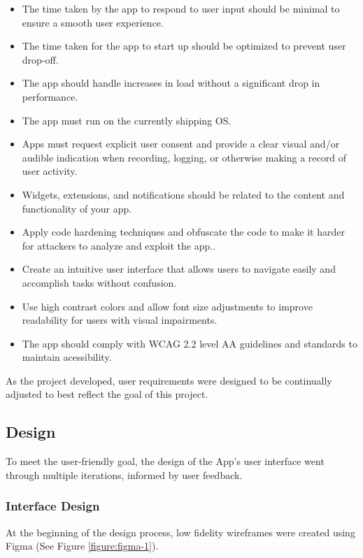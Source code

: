 \begin{itemize}
  \item The time taken by the app to respond to user input should be minimal
  to ensure a smooth user experience\cite{Tundwal2025}.
  \item The time taken for the app to start up should be optimized to prevent
  user drop-off\cite{Tundwal2025}.
  \item The app should handle increases in load without a
  significant drop in performance\cite{Tundwal2025}.
  \item The app must run on the currently shipping OS\cite{Apple2025}.
  \item Apps must request explicit user consent and provide a clear visual
  and/or audible indication when recording, logging, or otherwise making a
  record of user activity\cite{Apple2025}.
  \item Widgets, extensions, and notifications should be related to the
  content and functionality of your app\cite{Apple2025}.
  \item Apply code hardening techniques and obfuscate the code to make it
  harder for attackers to analyze and exploit the app.\cite{Tundwal2025}.
  \item Create an intuitive user interface that allows users to navigate easily and accomplish tasks without confusion\cite{Tundwal2025}.
  \item Use high contrast colors and allow font size adjustments to improve readability for users with visual impairments\cite{Tundwal2025}.
  \item The app should comply with WCAG 2.2 level AA guidelines and standards to maintain acessibility\cite{GovUK_WCAG}.
\end{itemize}

As the project developed, user requirements were designed to be continually adjusted to best reflect the goal of this project.


\subsection{Design}
To meet the user-friendly goal, the design of the App's user interface went through multiple iterations, informed by user feedback.

\subsubsection{Interface Design}
At the beginning of the design process, low fidelity wireframes were created using Figma (See Figure \ref{figure:figma-1}).

